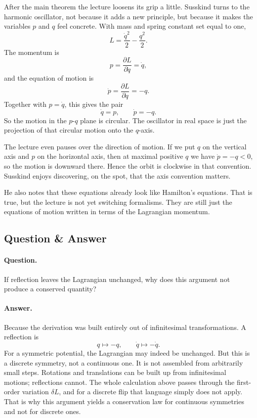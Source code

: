 After the main theorem the lecture loosens its grip a little. Susskind turns to the harmonic oscillator, not because it adds a new principle, but because it makes the variables \(p\) and \(q\) feel concrete. With mass and spring constant set equal to one,
\begin{equation}
L=\frac{\dot q^2}{2}-\frac{q^2}{2}.
\end{equation}
The momentum is
\begin{equation}
p=\frac{\partial L}{\partial \dot q}=\dot q,
\end{equation}
and the equation of motion is
\begin{equation}
\dot p=\frac{\partial L}{\partial q}=-q.
\end{equation}
Together with \(p=\dot q\), this gives the pair
\begin{equation}
\dot q=p,
\qquad
\dot p=-q.
\end{equation}
So the motion in the \(p\)-\(q\) plane is circular. The oscillator in real space is just the projection of that circular motion onto the \(q\)-axis.

The lecture even pauses over the direction of motion. If we put \(q\) on the vertical axis and \(p\) on the horizontal axis, then at maximal positive \(q\) we have \(\dot p=-q<0\), so the motion is downward there. Hence the orbit is clockwise in that convention. Susskind enjoys discovering, on the spot, that the axis convention matters.

He also notes that these equations already look like Hamilton's equations. That is true, but the lecture is not yet switching formalisms. They are still just the equations of motion written in terms of the Lagrangian momentum.

\subsection{Question \& Answer}

\paragraph{Question.} If reflection leaves the Lagrangian unchanged, why does this argument not produce a conserved quantity?

\paragraph{Answer.} Because the derivation was built entirely out of infinitesimal transformations. A reflection is
\begin{equation}
q\mapsto -q,
\qquad
\dot q\mapsto -\dot q.
\end{equation}
For a symmetric potential, the Lagrangian may indeed be unchanged. But this is a discrete symmetry, not a continuous one. It is not assembled from arbitrarily small steps. Rotations and translations can be built up from infinitesimal motions; reflections cannot. The whole calculation above passes through the first-order variation \(\delta L\), and for a discrete flip that language simply does not apply. That is why this argument yields a conservation law for continuous symmetries and not for discrete ones.


